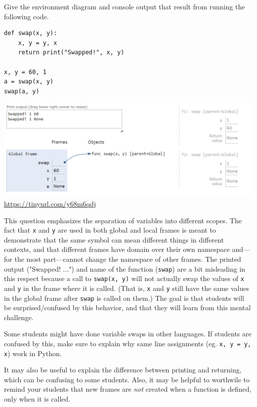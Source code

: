 \begin{blocksection}
\question Give the environment diagram and console output that result from running the following code.

\begin{lstlisting}
def swap(x, y):
    x, y = y, x
    return print("Swapped!", x, y)

x, y = 60, 1
a = swap(x, y)
swap(a, y)
\end{lstlisting}

\begin{solution}[2in]
\includegraphics[scale=0.5]{swap.png}
\\
\url{https://tinyurl.com/y68m6qdj}
\end{solution}
\end{blocksection}

\begin{questionmeta}
  This question emphasizes the separation of variables into different scopes. The fact that \lstinline{x} and \lstinline{y} are used in both global and local frames is meant to demonstrate that the same symbol can mean different things in different contexts, and that different frames have domain over their own namespace and---for the most part---cannot change the namespace of other frames. The printed output ("Swapped! ...") and name of the function (\lstinline{swap}) are a bit misleading in this respect because a call to \lstinline{swap(x, y)} will not actually swap the values of \lstinline{x} and \lstinline{y} in the frame where it is called. (That is, \lstinline{x} and \lstinline{y} still have the same values in the global frame after \lstinline{swap} is called on them.) The goal is that students will be surprised/confused by this behavior, and that they will learn from this mental challenge. 

  Some students might have done variable swaps in other languages. If students are confused by this, make sure to explain why same line assignments (eg. \lstinline{x, y = y, x}) work in Python.

  It may also be useful to explain the difference between printing and returning, which can be confusing to some students. Also, it may be helpful to worthwile to remind your students that new frames are \textit{not} created when a function is defined, only when it is called. 
\end{questionmeta}
